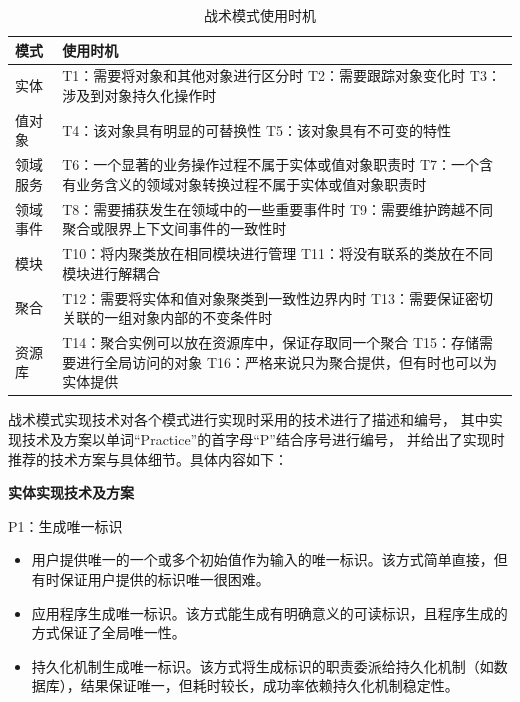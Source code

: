 {\footnotesize
\begin{longtable}[h]{m{70pt}|m{315pt}}
    \caption[战术模式使用时机]{战术模式使用时机} \label{patternsTime} \\
        \hline  
        模式&使用时机\\
        \hline
        实体&T1：需要将对象和其他对象进行区分时
        \newline T2：需要跟踪对象变化时
        \newline T3：涉及到对象持久化操作时\\
        \hline
        值对象&T4：该对象具有明显的可替换性
        \newline T5：该对象具有不可变的特性\\
        \hline
        领域服务&T6：一个显著的业务操作过程不属于实体或值对象职责时
        \newline T7：一个含有业务含义的领域对象转换过程不属于实体或值对象职责时\\
        \hline
        领域事件&T8：需要捕获发生在领域中的一些重要事件时
        \newline T9：需要维护跨越不同聚合或限界上下文间事件的一致性时\\
        \hline
        模块&T10：将内聚类放在相同模块进行管理
        \newline T11：将没有联系的类放在不同模块进行解耦合\\
        \hline
        聚合&T12：需要将实体和值对象聚类到一致性边界内时
        \newline T13：需要保证密切关联的一组对象内部的不变条件时\\
        \hline
        资源库&T14：聚合实例可以放在资源库中，保证存取同一个聚合
        \newline T15：存储需要进行全局访问的对象
        \newline T16：严格来说只为聚合提供，但有时也可以为实体提供\\
        \hline
\end{longtable}
}

战术模式实现技术对各个模式进行实现时采用的技术进行了描述和编号，
其中实现技术及方案以单词“Practice”的首字母“P”结合序号进行编号，
并给出了实现时推荐的技术方案与具体细节。具体内容如下：


\textbf{实体实现技术及方案}

P1：生成唯一标识
\begin{itemize}[leftmargin = 40pt]
    \item 用户提供唯一的一个或多个初始值作为输入的唯一标识。该方式简单直接，但有时保证用户提供的标识唯一很困难。
    \item 应用程序生成唯一标识。该方式能生成有明确意义的可读标识，且程序生成的方式保证了全局唯一性。
    \item 持久化机制生成唯一标识。该方式将生成标识的职责委派给持久化机制（如数据库），结果保证唯一，但耗时较长，成功率依赖持久化机制稳定性。
\end{itemize}

